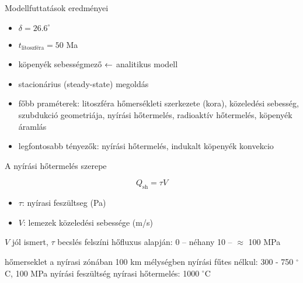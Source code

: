 \begin{frame}{Modellfuttatások eredményei}
    \begin{minipage}[c]{0.45\textwidth}
        
    \end{minipage}
    \begin{minipage}[c]{0.45\textwidth}
        \begin{itemize}
            \item $\delta = 26.6^\circ$
            \item $t_{\text{litoszféra}} = 50$ Ma
            \item köpenyék sebességmező $\leftarrow$ analitikus modell
            \item stacionárius (steady-state) megoldás
            \item főbb praméterek: litoszféra hőmersékleti szerkezete (kora), közeledési sebesség, szubdukció geometriája, nyírási hőtermelés, radioaktív hőtermelés, köpenyék áramlás
            \item legfontosabb tényezők: nyírási hőtermelés, indukalt köpenyék konvekcio
        \end{itemize}
    \end{minipage}
\end{frame}


\begin{frame}{A nyírási hőtermelés szerepe}
    \begin{minipage}[c]{0.45\textwidth}
        
    \end{minipage}
    \begin{minipage}[c]{0.45\textwidth}
        \[
            Q_{\text{sh}} = \tau V
        \]
        \begin{itemize}
            \item $\tau$: nyírasi feszültseg (Pa)
            \item $V$: lemezek közeledési sebessége (m/s)
        \end{itemize}
        \vspace{10pt}
        
        $V$ jól ismert, $\tau$ becslés felszíni hőfluxus alapján: 0 -- néhany 10 -- $\approx$ 100 MPa
        \vspace{10pt}
        
        hőmerseklet a nyírasi zónában 100 km mélységben nyírási fűtes nélkul: 300 - 750 $^\circ$C, 100 MPa nyírási feszültség nyírasi hőtermelés: 1000 $^\circ$C
    \end{minipage}
\end{frame}



